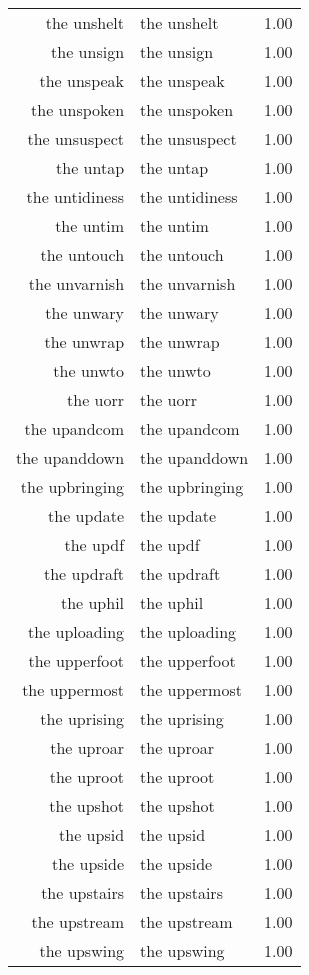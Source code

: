 \begin{table}[ht]
\begin{tabular}{rlr}
  the unshelt & the unshelt & 1.00 \\ 
  the unsign & the unsign & 1.00 \\ 
  the unspeak & the unspeak & 1.00 \\ 
  the unspoken & the unspoken & 1.00 \\ 
  the unsuspect & the unsuspect & 1.00 \\ 
  the untap & the untap & 1.00 \\ 
  the untidiness & the untidiness & 1.00 \\ 
  the untim & the untim & 1.00 \\ 
  the untouch & the untouch & 1.00 \\ 
  the unvarnish & the unvarnish & 1.00 \\ 
  the unwary & the unwary & 1.00 \\ 
  the unwrap & the unwrap & 1.00 \\ 
  the unwto & the unwto & 1.00 \\ 
  the uorr & the uorr & 1.00 \\ 
  the upandcom & the upandcom & 1.00 \\ 
  the upanddown & the upanddown & 1.00 \\ 
  the upbringing & the upbringing & 1.00 \\ 
  the update & the update & 1.00 \\ 
  the updf & the updf & 1.00 \\ 
  the updraft & the updraft & 1.00 \\ 
  the uphil & the uphil & 1.00 \\ 
  the uploading & the uploading & 1.00 \\ 
  the upperfoot & the upperfoot & 1.00 \\ 
  the uppermost & the uppermost & 1.00 \\ 
  the uprising & the uprising & 1.00 \\ 
  the uproar & the uproar & 1.00 \\ 
  the uproot & the uproot & 1.00 \\ 
  the upshot & the upshot & 1.00 \\ 
  the upsid & the upsid & 1.00 \\ 
  the upside & the upside & 1.00 \\ 
  the upstairs & the upstairs & 1.00 \\ 
  the upstream & the upstream & 1.00 \\ 
  the upswing & the upswing & 1.00 \\ 

\end{tabular}
\end{table}
